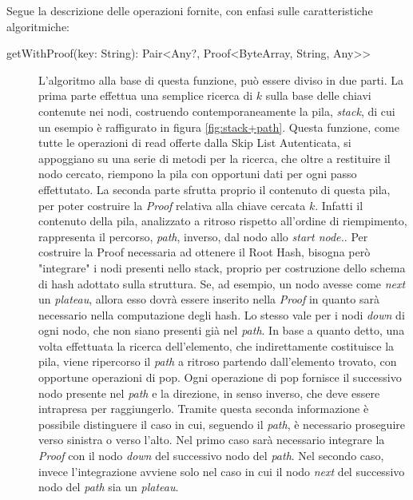 	Segue la descrizione delle operazioni fornite, con enfasi sulle caratteristiche algoritmiche:
	
	\begin{description}
		\item[getWithProof(key: String): Pair<Any?, Proof<ByteArray, String, Any>{}>] L'algoritmo alla base di questa funzione, può essere diviso in due parti. La prima parte effettua una semplice ricerca di $ k $ sulla base delle chiavi contenute nei nodi, costruendo contemporaneamente la pila, \textit{stack}, di cui un esempio è raffigurato in figura \ref{fig:stack+path}. Questa funzione, come tutte le operazioni di read offerte dalla Skip List Autenticata, si appoggiano su una serie di metodi per la ricerca, che oltre a restituire il nodo cercato, riempono la pila con opportuni dati per ogni passo effettutato. La seconda parte sfrutta proprio il contenuto di questa pila, per poter costruire la \textit{Proof} relativa alla chiave cercata $ k $. Infatti il contenuto della pila, analizzato a ritroso rispetto all'ordine di riempimento, rappresenta il percorso, \textit{path}, inverso, dal nodo allo \textit{start node.}. Per costruire la Proof necessaria ad ottenere il Root Hash, bisogna però "integrare" i nodi presenti nello stack, proprio per costruzione dello schema di hash adottato sulla struttura. Se, ad esempio, un nodo avesse come \textit{next} un \textit{plateau}, allora esso dovrà essere inserito nella \textit{Proof} in quanto sarà necessario nella computazione degli hash. Lo stesso vale per i nodi \textit{down} di ogni nodo, che non siano presenti già nel \textit{path}.
		In base a quanto detto, una volta effettuata la ricerca dell'elemento, che indirettamente costituisce la pila, viene ripercorso il \textit{path} a ritroso partendo dall'elemento trovato, con opportune operazioni di pop. Ogni operazione di pop fornisce il successivo nodo presente nel \textit{path} e la direzione, in senso inverso, che deve essere intrapresa per raggiungerlo. Tramite questa seconda informazione è possibile distinguere il caso in cui, seguendo il \textit{path}, è necessario proseguire verso sinistra o verso l'alto. Nel primo caso sarà necessario integrare la \textit{Proof} con il nodo \textit{down} del successivo nodo del \textit{path}. Nel secondo caso, invece l'integrazione avviene solo nel caso in cui il nodo \textit{next} del successivo nodo del \textit{path} sia un \textit{plateau}.
		

\end{description}
